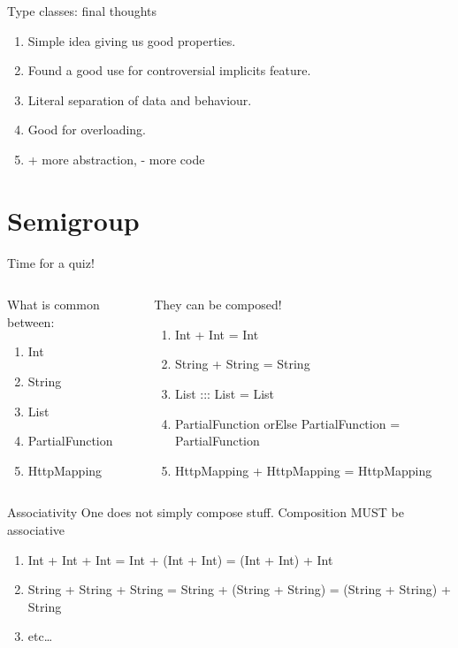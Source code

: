 \documentclass[presentation,aspectratio=169,smaller]{beamer}
\begin{document}
\begin{frame}[label={sec:org8049162}]{Type classes: final thoughts}
\begin{enumerate}
\item Simple idea giving us good properties.
\item Found a good use for controversial implicits feature.
\item Literal separation of data and behaviour.
\item Good for overloading.
\item + more abstraction, - more code
\end{enumerate}
\end{frame}

\section*{Semigroup}
\label{sec:orgbfba5eb}

\begin{frame}[label={sec:org3518b70}]{Time for a quiz!}
\begin{columns}
\begin{column}[t]{0.5\columnwidth}
What is common between:
\begin{enumerate}
\item Int
\item String
\item List
\item PartialFunction
\item HttpMapping
\end{enumerate}

\pause
\end{column}

\begin{column}[t]{0.5\columnwidth}
They can be composed!
\begin{enumerate}
\item Int + Int = Int
\item String + String = String
\item List ::: List = List
\item PartialFunction orElse PartialFunction = PartialFunction
\item HttpMapping + HttpMapping = HttpMapping
\end{enumerate}
\end{column}
\end{columns}
\end{frame}

\begin{frame}[label={sec:orgff51473}]{Associativity}
One does not simply compose stuff. Composition MUST be associative
\begin{enumerate}
\item Int + Int + Int = Int + (Int + Int) = (Int + Int) + Int
\item String + String + String = String + (String + String) = (String + String) + String
\item etc\ldots{}
\end{enumerate}
\end{frame}
\end{document}
